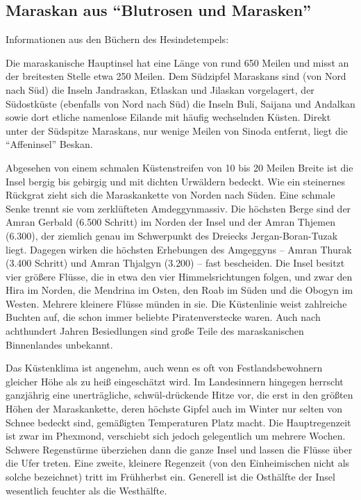 \subsection{Maraskan aus ``Blutrosen und Marasken''}
Informationen aus den Büchern des Hesindetempels:

Die maraskanische Hauptinsel hat eine Länge von rund 650 Meilen und misst an der breitesten Stelle etwa 250 Meilen. Dem Südzipfel Maraskans sind (von Nord nach Süd) die Inseln Jandraskan, Etlaskan und Jilaskan vorgelagert, der Südostküste (ebenfalls von Nord nach Süd) die Inseln Buli, Saijana und Andalkan sowie dort etliche namenlose Eilande mit häufig wechselnden Küsten. Direkt unter der Südspitze Maraskans, nur wenige Meilen von Sinoda entfernt, liegt die ``Affeninsel'' Beskan.

Abgesehen von einem schmalen Küstenstreifen von 10 bis 20 Meilen Breite ist die Insel bergig bis gebirgig und mit dichten Urwäldern bedeckt. Wie ein steinernes Rückgrat zieht sich die Maraskankette von Norden nach Süden. Eine schmale Senke trennt sie vom zerklüfteten Amdeggynmassiv. Die höchsten Berge sind der Amran Gerbald (6.500 Schritt) im Norden der Insel und der Amran Thjemen (6.300), der ziemlich genau im Schwerpunkt des Dreiecks Jergan-Boran-Tuzak liegt. Dagegen wirken die höchsten Erhebungen des Amgeggyns -- Amran Thurak (3.400 Schritt) und Amran Thjalgyn (3.200) -- fast bescheiden. Die Insel besitzt vier größere Flüsse, die in etwa den vier Himmelsrichtungen folgen, und zwar den Hira im Norden, die Mendrina im Osten, den Roab im Süden und die Obogyn im Westen. Mehrere kleinere Flüsse münden in sie. Die Küstenlinie weist zahlreiche Buchten auf, die schon immer beliebte Piratenverstecke waren. Auch nach achthundert
Jahren Besiedlungen sind große Teile des maraskanischen Binnenlandes unbekannt.

Das Küstenklima ist angenehm, auch wenn es oft von Festlandsbewohnern gleicher Höhe als zu heiß eingeschätzt wird. Im Landesinnern hingegen herrscht ganzjährig eine unerträgliche, schwül-drückende Hitze vor, die erst in den größten Höhen der Maraskankette, deren höchste Gipfel auch im Winter nur selten von Schnee bedeckt sind, gemäßigten Temperaturen Platz macht. Die Hauptregenzeit ist zwar im Phexmond, verschiebt sich jedoch gelegentlich um mehrere Wochen. Schwere Regenstürme überziehen dann die ganze Insel und lassen die Flüsse über die Ufer treten. Eine zweite, kleinere Regenzeit (von den Einheimischen nicht als solche bezeichnet) tritt im Frühherbst ein. Generell ist die Osthälfte der Insel wesentlich feuchter als
die Westhälfte.

